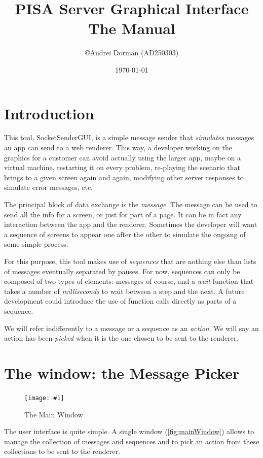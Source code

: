 \documentclass[11pt]{refart}
\title{PISA Server Graphical Interface\\The Manual}
\author{\copyright Andrei Dorman (AD250303)}
\date{\today}
\newenvironment{fullfigure}[1][ht]
{%
\begin{figure}[#1]%
  	\hspace*{-\leftmarginwidth}%
  	\begin{minipage}{\fullwidth}%
}%
{%
	\end{minipage}%
\end{figure}%
}
\newcommand{\fullscreenshot}[3]{%
	\begin{fullfigure}[ht]%
  		\texttt{[image: \#1]}%
  		\caption{#2}%
  		\label{#3}%
	\end{fullfigure}%
}
\newcommand*{\socketsender}{SocketSenderGUI\xspace}
\begin{document}
\maketitle
\vfill
\tableofcontents

\pagebreak

\null
\vfill
\section{Introduction}

This tool, \socketsender, is a simple message sender that \emph{simulates} messages an app can send to a web renderer.
This way, a developer working on the graphics for a customer can avoid actually using the larger app, maybe on a virtual machine, restarting it on every problem, re-playing the scenario that brings to a given screen again and again, modifying other server responses to simulate error messages, etc. 

The principal block of data exchange is the \emph{message}. 
The message can be used to send all the info for a screen, or just for part of a page.
It can be in fact any interaction between the app and the renderer.
Sometimes the developer will want a sequence of screens to appear one after the other to simulate the ongoing of some simple process. 

For this purpose, this tool makes use of \emph{sequences} that are nothing else than lists of messages eventually separated by pauses.
For now, sequences can only be composed of two types of elements: messages of course, and a \emph{wait} function that takes a number of \emph{milliseconds} to wait between a step and the next.
A future development could introduce the use of function calls directly as parts of a sequence.

We will refer indifferently to a message or a sequence as an \emph{action}. 
We will say an action has been \emph{picked} when it is the one chosen to be sent to the renderer.

\pagebreak
\section{The window: the Message Picker}

\fullscreenshot{../screenshots/01_MainWindow.png}{The Main Window}{fig:mainWindow}

The user interface is quite simple.
A single window (\autoref{fig:mainWindow}) allows to manage the collection of messages and sequences and to pick an action from these collections to be sent to the renderer.
\end{document}
